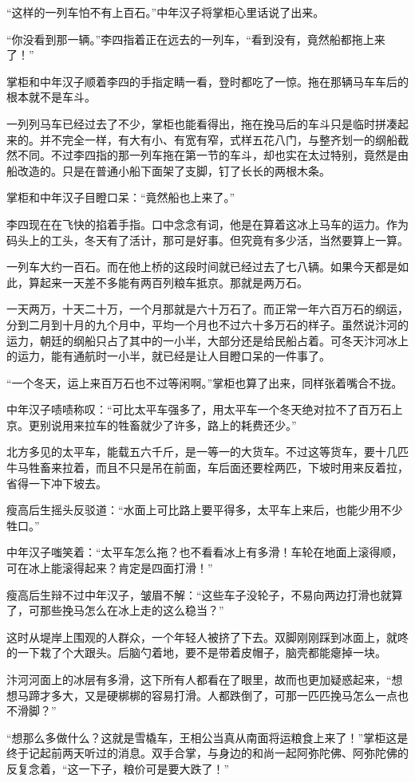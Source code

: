 “这样的一列车怕不有上百石。”中年汉子将掌柜心里话说了出来。

“你没看到那一辆。”李四指着正在远去的一列车，“看到没有，竟然船都拖上来了！”

掌柜和中年汉子顺着李四的手指定睛一看，登时都吃了一惊。拖在那辆马车车后的根本就不是车斗。

一列列马车已经过去了不少，掌柜也能看得出，拖在挽马后的车斗只是临时拼凑起来的。并不完全一样，有大有小、有宽有窄，式样五花八门，与整齐划一的纲船截然不同。不过李四指的那一列车拖在第一节的车斗，却也实在太过特别，竟然是由船改造的。只是在普通小船下面架了支脚，钉了长长的两根木条。

掌柜和中年汉子目瞪口呆：“竟然船也上来了。”

李四现在在飞快的掐着手指。口中念念有词，他是在算着这冰上马车的运力。作为码头上的工头，冬天有了活计，那可是好事。但究竟有多少活，当然要算上一算。

一列车大约一百石。而在他上桥的这段时间就已经过去了七八辆。如果今天都是如此，算起来一天差不多能有两百列粮车抵京。那就是两万石。

一天两万，十天二十万，一个月那就是六十万石了。而正常一年六百万石的纲运，分到二月到十月的九个月中，平均一个月也不过六十多万石的样子。虽然说汴河的运力，朝廷的纲船只占了其中的一小半，大部分还是给民船占着。可冬天汴河冰上的运力，能有通航时一小半，就已经是让人目瞪口呆的一件事了。

“一个冬天，运上来百万石也不过等闲啊。”掌柜也算了出来，同样张着嘴合不拢。

中年汉子啧啧称叹：“可比太平车强多了，用太平车一个冬天绝对拉不了百万石上京。更别说用来拉车的牲畜就少了许多，路上的耗费还少。”

北方多见的太平车，能载五六千斤，是一等一的大货车。不过这等货车，要十几匹牛马牲畜来拉着，而且不只是吊在前面，车后面还要栓两匹，下坡时用来反着拉，省得一下冲下坡去。

瘦高后生摇头反驳道：“水面上可比路上要平得多，太平车上来后，也能少用不少牲口。”

中年汉子嗤笑着：“太平车怎么拖？也不看看冰上有多滑！车轮在地面上滚得顺，可在冰上能滚得起来？肯定是四面打滑！”

瘦高后生辩不过中年汉子，皱眉不解：“这些车子没轮子，不易向两边打滑也就算了，可那些挽马怎么在冰上走的这么稳当？”

这时从堤岸上围观的人群众，一个年轻人被挤了下去。双脚刚刚踩到冰面上，就咚的一下栽了个大跟头。后脑勺着地，要不是带着皮帽子，脑壳都能瘪掉一块。

汴河河面上的冰层有多滑，这下所有人都看在了眼里，故而也更加疑惑起来，“想想马蹄才多大，又是硬梆梆的容易打滑。人都跌倒了，可那一匹匹挽马怎么一点也不滑脚？”

“想那么多做什么？这就是雪橇车，王相公当真从南面将运粮食上来了！”掌柜这是终于记起前两天听过的消息。双手合掌，与身边的和尚一起阿弥陀佛、阿弥陀佛的反复念着，“这一下子，粮价可是要大跌了！”

